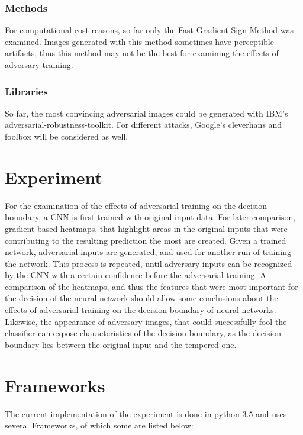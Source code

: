 \documentclass[draft,final]{vutinfth} %
\begin{document}
\subsubsection{Methods}
For computational cost reasons, so far only the Fast Gradient Sign Method was examined. Images generated with this method sometimes have perceptible artifacts, thus this method may not be the best for examining the effects of adversary training.

\subsubsection{Libraries}

So far, the most convincing adversarial images could be generated with IBM's adversarial-robustness-toolkit. For different attacks, Google's cleverhans and foolbox will be considered as well.

\section{Experiment}

For the examination of the effects of adversarial training on the decision boundary, a CNN is first trained with original input data. For later comparison, gradient based heatmaps, that highlight areas in the original inputs
that were contributing to the resulting prediction the most are created. Given a trained network, adversarial inputs are generated, and used for another run of training the network. This process is repeated, until adversary
inputs can be recognized by the CNN with a certain confidence before the adversarial training. 
A comparison of the heatmaps, and thus the features that were most important for the decision of the neural network should allow some conclusions about the effects of adversarial training on the decision boundary of neural networks. Likewise,
the appearance of adversary images, that could successfully fool the classifier can expose characteristics of the decision boundary, as the decision boundary lies between the original input and the tempered one.

\section{Frameworks}

The current implementation of the experiment is done in python 3.5 and uses several Frameworks, of which some are listed below:
\end{document}
